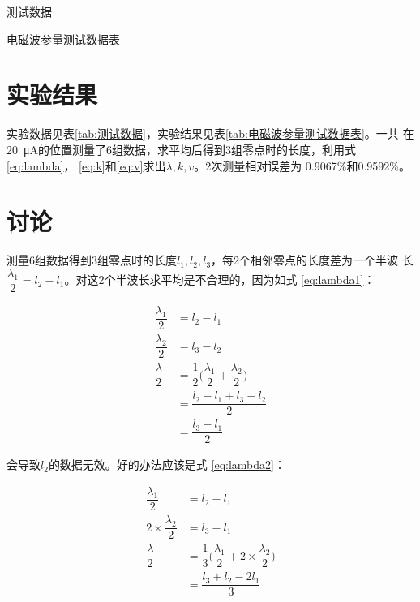 \documentclass[../main]{subfiles}
\begin{document}
\begin{table}[htbp]
	\centering
	\caption{测试数据}
	\label{tab:测试数据}
\end{table}

\begin{table}[htbp]
	\centering
	\caption{电磁波参量测试数据表}
	\label{tab:电磁波参量测试数据表}
\end{table}

\section{实验结果}%
\label{sec:\arabic{chapter}实验结果}

实验数据见表\ref{tab:测试数据}，实验结果见表\ref{tab:电磁波参量测试数据表}。一共
在\SI{20}{\uA}的位置测量了6组数据，求平均后得到3组零点时的长度，利用式
\ref{eq:lambda}， \ref{eq:k}和\ref{eq:v}求出$ \lambda, k, v $。2次测量相对误差为
0.9067\%和0.9592\%。

\section{讨论}%
\label{sec:\arabic{chapter}讨论}

测量6组数据得到3组零点时的长度$ l_1, l_2, l_3 $，每2个相邻零点的长度差为一个半波
长$ \dfrac{\lambda_1 }{2} = l_2 - l_1 $。对这2个半波长求平均是不合理的，因为如式
\ref{eq:lambda1}：

\begin{align}
	\dfrac{\lambda_1}{2} & = l_2 - l_1\\
	\dfrac{\lambda_2}{2} & = l_3 - l_2\\
	\dfrac{\lambda }{2} & = \dfrac{1}{2}\Big(\dfrac{\lambda_1}{2} +
	\label{eq:lambda1}
	\dfrac{\lambda_2}{2}\Big)\\
			    & = \dfrac{l_2 - l_1 + l_3 - l_2}{2}\\
			    & = \dfrac{l_3 - l_1}{2}
\end{align}

会导致$ l_2 $的数据无效。好的办法应该是式 \ref{eq:lambda2}：

\begin{align}
	\dfrac{\lambda_1}{2} & = l_2 - l_1\\
	2\times \dfrac{\lambda_2}{2} & = l_3 - l_1\\
	\label{eq:lambda2}
	\dfrac{\lambda }{2} & = \dfrac{1}{3}\Big(\dfrac{\lambda_1}{2} + 2\times
	\dfrac{\lambda_2}{2}\Big)\\
			    & = \dfrac{l_3 + l_2 - 2l_1}{3}
\end{align}
\end{document}
